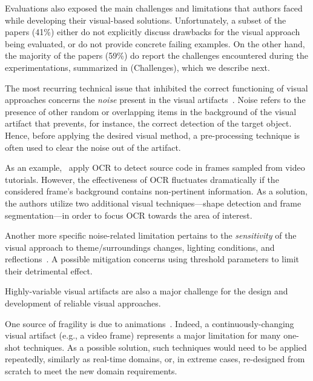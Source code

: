 
Evaluations also exposed the main challenges and limitations that authors faced while developing their visual-based solutions. 
Unfortunately, a subset of the papers (41\%) either do not explicitly discuss drawbacks for the visual approach being evaluated, or do not provide concrete failing examples. On the other hand, the majority of the papers (59\%) do report the challenges encountered during the experimentations, summarized in  (Challenges),  which we describe next. 

The most recurring technical issue that inhibited the correct functioning of visual approaches concerns the \textit{noise} present in the visual artifacts~\cite{Ponzanelli-2016-ICSE,Reiss-2018-ASEj,Bao-2017-EMSE,Nguyen-2015-ASE,Kuchta-2018-EMSE,Leotta-2018-STVR,Li-2010-CHI,Lin-2014-TSE}. 
Noise refers to the presence of other random or overlapping items in the background of the visual artifact that prevents, for instance, the correct detection of the target object. Hence, before applying the desired visual method, a pre-processing technique is often used to clear the noise out of the artifact. 

As an example,~\citet{Ponzanelli-2016-ICSE} apply OCR to detect source code in frames sampled from video tutorials. However, the effectiveness of OCR fluctuates dramatically if the considered frame's background contains non-pertinent information. As a solution, the authors utilize two additional visual techniques---shape detection and frame segmentation---in order to focus OCR towards the area of interest.

Another more specific noise-related limitation pertains to the \textit{sensitivity} of the visual approach to theme/surroundings changes, lighting conditions, and reflections~\cite{Chang-2010-CHI,Kirac-2018-JSS,Leotta-2018-STVR,Kuchta-2018-EMSE,Li-2010-CHI,Lin-2014-TSE}. A possible mitigation concerns using threshold parameters to limit their detrimental effect. 

 Highly-variable visual artifacts are also a major challenge for the design and development of reliable visual approaches. 

One source of fragility is due to animations~\cite{canvas_icst2018,Chang-2010-CHI,Choudhary-2010-ICSM}. Indeed, a continuously-changing visual artifact (e.g., a video frame) represents a major limitation for many one-shot techniques. As a possible solution, such techniques would need to be applied repeatedly, similarly as real-time domains, or, in extreme cases, re-designed from scratch to meet the new domain requirements. 

